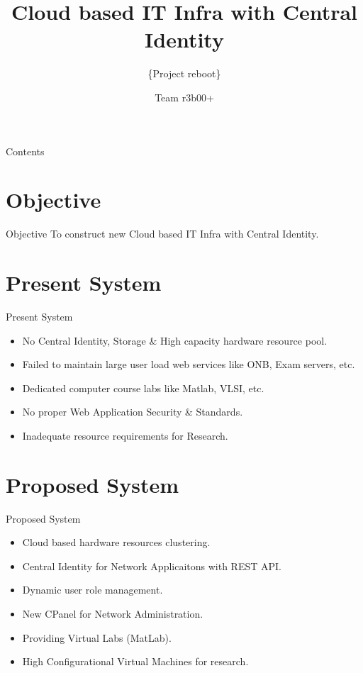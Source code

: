 \documentclass[xcolor=dvipsnames]{beamer}
\title[Cloud based IT Infra with Central Identity]{Cloud based IT Infra with Central Identity}
\subtitle{\{Project reboot\}}
\author{Team r3b00+}
\institute{Dept. of CSE, RGUKT - Nuzvid}
\begin{document}
\begin{frame}
\titlepage
\end{frame}

\begin{frame}{Contents}
\tableofcontents
\end{frame}




\section{Objective}
\begin{frame}{Objective}
To construct new Cloud based IT Infra with Central Identity.
\end{frame}

\section{Present System}
\begin{frame}{Present System}

\begin{itemize}
	\item No Central Identity, Storage \& High capacity hardware resource pool.
	\item Failed to maintain large user load web services like ONB, Exam servers, etc.
	\item Dedicated computer course labs like Matlab, VLSI, etc.
	\item No proper Web Application Security \& Standards.
	\item Inadequate resource requirements for Research.
\end{itemize}

\end{frame}



\section{Proposed System}
\begin{frame}{Proposed System}
\begin{itemize}
	\item Cloud based hardware resources clustering.
	\item Central Identity for Network Applicaitons with REST API.
	\item Dynamic user role management.
	\item New CPanel for Network Administration.
	\item Providing Virtual Labs (MatLab).
	\item High Configurational Virtual Machines for research.
\end{itemize}
\end{frame}
\end{document}
